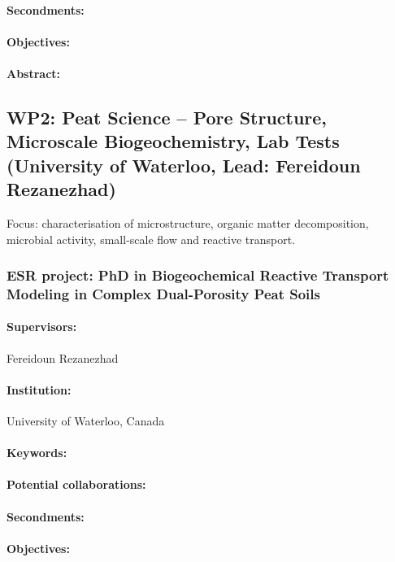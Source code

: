 \documentclass[12pt]{article}
\begin{document}
\paragraph{Secondments:} 
\paragraph{Objectives:} 
\paragraph{Abstract:} 

\subsection{WP2: Peat Science – Pore Structure, Microscale Biogeochemistry, Lab Tests (University of Waterloo, Lead: Fereidoun Rezanezhad)}

Focus: characterisation of microstructure, organic matter decomposition, microbial activity, small-scale flow and reactive transport.

\subsubsection*{ESR project: PhD in Biogeochemical Reactive Transport Modeling in Complex Dual-Porosity Peat Soils }
\paragraph{Supervisors:} Fereidoun Rezanezhad
\paragraph{Institution:} University of Waterloo, Canada
\paragraph{Keywords:} 
\paragraph{Potential collaborations:} 
\paragraph{Secondments:} 
\paragraph{Objectives:} 
\end{document}
